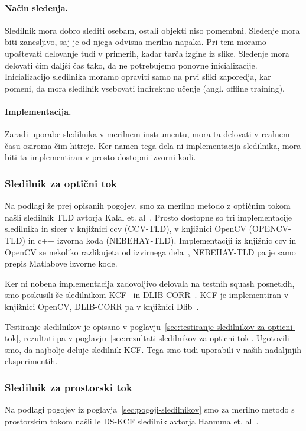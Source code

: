 \paragraph{Način sledenja.} Sledilnik mora dobro slediti osebam, ostali objekti niso pomembni. Sledenje mora biti zanesljivo, saj je od njega odvisna merilna napaka. Pri tem moramo upoštevati delovanje tudi v primerih, kadar tarča izgine iz slike. Sledenje mora delovati čim daljši čas tako, da ne potrebujemo ponovne inicializacije. Inicializacijo sledilnika moramo opraviti samo na prvi sliki zaporedja, kar pomeni, da mora sledilnik vsebovati indirektno učenje (angl. offline training).

\paragraph{Implementacija.} Zaradi uporabe sledilnika v merilnem instrumentu, mora ta delovati v realnem času oziroma čim hitreje. Ker namen tega dela ni implementacija sledilnika, mora biti ta implementiran v prosto dostopni izvorni kodi. 


\subsubsection{Sledilnik za optični tok}
Na podlagi že prej opisanih pogojev, smo za merilno metodo z optičnim tokom našli sledilnik TLD avtorja Kalal et. al~\cite{kalal2012tracking}. Prosto dostopne so tri implementacije sledilnika in sicer v knjižnici ccv (CCV-TLD), v knjižnici OpenCV (OPENCV-TLD) in c++ izvorna koda (NEBEHAY-TLD). Implementaciji iz knjižnic ccv in OpenCV se nekoliko razlikujeta od izvirnega dela~\cite{kalal2012tracking}, NEBEHAY-TLD pa je samo prepis Matlabove izvorne kode. 

Ker ni nobena implementacija zadovoljivo delovala na testnih squash posnetkih, smo poskusili še sledilnikom KCF~\cite{danelljan2014adaptive} in DLIB-CORR~\cite{danelljan2014accurate}. KCF je implementiran v knjižnici OpenCV, DLIB-CORR pa v knjižnici Dlib~\cite{king2009dlib}.

Testiranje sledilnikov je opisano v poglavju~\ref{sec:testiranje-sledilnikov-za-opticni-tok}, rezultati pa v poglavju~\ref{sec:rezultati-sledilnikov-za-opticni-tok}. Ugotovili smo, da najbolje deluje sledilnik KCF. Tega smo tudi uporabili v naših nadaljnjih eksperimentih.

\subsubsection{Sledilnik za prostorski tok}
Na podlagi pogojev iz poglavja~\ref{sec:pogoji-sledilnikov} smo za merilno metodo s prostorskim tokom našli le DS-KCF sledilnik avtorja Hannuna et. al~\cite{hannuna2016ds}. 

